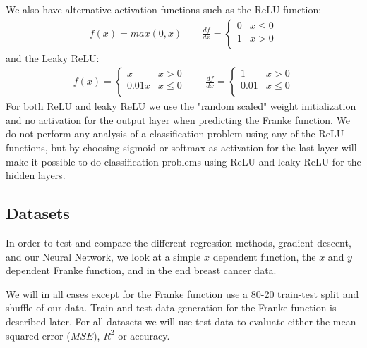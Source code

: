\documentclass[11pt]{article}
\begin{document}
We also have alternative activation functions such as the ReLU function:
\begin{align*}
    f(x) = max(0, x) \quad\quad \frac{df }{dx} =
    \begin{cases}
        0 & x\leq 0 \\
        1 & x > 0   \\
    \end{cases}
\end{align*}
and the Leaky ReLU:
\begin{align*}
    f(x) =
    \begin{cases}
        x     & x > 0    \\
        0.01x & x \leq 0 \\
    \end{cases}
    \quad\quad \frac{df }{dx} =
    \begin{cases}
        1    & x > 0    \\
        0.01 & x \leq 0 \\
    \end{cases}
\end{align*}
For both ReLU and leaky ReLU we use the "random scaled" weight initialization and no activation for the output layer when predicting the Franke function. We do not perform any analysis of a classification problem using any of the ReLU functions, but by choosing sigmoid or softmax \cite{softmax} as activation for the last layer will make it possible to do classification problems using ReLU and leaky ReLU for the hidden layers.

\subsection{Datasets}
In order to test and compare the different regression methods, gradient descent, and our Neural Network, we look at a simple $x$ dependent function, the $x$ and $y$ dependent Franke function, and in the end breast cancer data.

We will in all cases except for the Franke function use a 80-20 train-test split and shuffle of our data. Train and test data generation for the Franke function is described later. For all datasets we will use test data to evaluate either the mean squared error ($MSE$), $R^2$ or accuracy.
\end{document}
